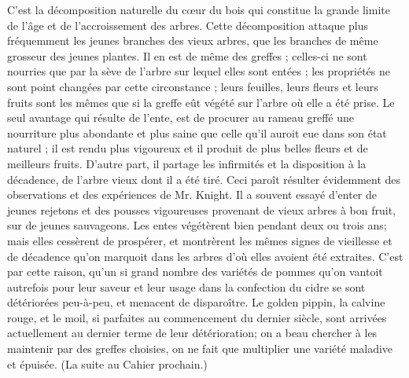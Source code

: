 C'est la décomposition naturelle du cœur du bois qui constitue la grande limite de l'âge et de l'accroissement des arbres. Cette décomposition attaque plus fréquemment les jeunes branches des vieux arbres, que les branches de même grosseur des jeunes plantes. Il en est de même des greffes ; celles-ci ne sont nourries que par la sève de l'arbre sur lequel elles sont entées ; les propriétés ne sont point changées par cette circonstance ; leurs feuilles, leurs fleurs et leurs fruits sont les mêmes que si la greffe eût végété sur l'arbre où elle a été prise. Le seul avantage qui résulte de l'ente, est de procurer au rameau greffé une nourriture plus abondante et plus saine que celle qu'il auroit eue dans son état naturel ; il est rendu plus vigoureux et il produit de plus belles fleurs et de meilleurs fruits. D'autre part, il partage les infirmités et la disposition à la décadence, de l'arbre vieux dont il a été tiré.
Ceci paroît résulter évidemment des observations et des expériences de Mr. Knight. Il a souvent essayé d'enter de jeunes rejetons\setcounter{page}{108} et des pousses vigoureuses provenant de vieux arbres à bon fruit, sur de jeunes sauvageons. Les entes végétèrent bien pendant deux ou trois ans; mais elles cessèrent de prospérer, et montrèrent les mêmes signes de vieillesse et de décadence qu'on marquoit dans les arbres d'où elles avoient été extraites.
C'est par cette raison, qu'un si grand nombre des variétés de pommes qu'on vantoit autrefois pour leur saveur et leur usage dans la confection du cidre se sont détériorées peu-à-peu, et menacent de disparoître. Le golden pippin, la calvine rouge, et le moil, si parfaites au commencement du dernier siècle, sont arrivées actuellement au dernier terme de leur détérioration; on a beau chercher à les maintenir par des greffes choisies, on ne fait que multiplier une variété maladive et épuisée.
(La suite au Cahier prochain.)